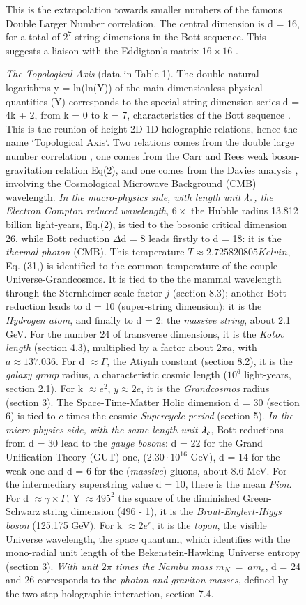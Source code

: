 \documentclass[twoside,draft]{article}
\begin{document}
\begin{sloppypar}
\begin{figure}
\caption{\textit{The Topological Axis} (data in Table 1). The double natural logarithms y = ln(ln(Y)) of the main dimensionless physical quantities (Y) corresponds to the special string dimension series d = 4k + 2, from k = 0 to k = 7, characteristics of the Bott sequence \cite{Cartan}. This is the reunion of height 2D-1D holographic relations, hence the name `Topological Axis`. Two relations comes from the double large number correlation \cite{Eddington}, one comes from the Carr and Rees weak boson-gravitation relation Eq(2), and one comes from the Davies analysis \cite{Davies}, involving the Cosmological Microwave Background (CMB) wavelength. \textit{In the macro-physics side, with length unit $\lambdabar_e$, the Electron Compton reduced wavelength}, $6 \times$ the Hubble radius 13.812 billion light-years, Eq.(2), is tied to the bosonic critical dimension 26, while Bott reduction $\Delta$d = 8 leads firstly to  d = 18: it is the \textit{thermal photon} (CMB). This temperature $T \approx 2.725820805 Kelvin$, Eq. (31,) is identified to the common temperature of the couple Universe-Grandcosmos. It is tied to the the mammal wavelength through the Sternheimer scale factor $j$ (section 8.3); another Bott reduction leads to d = 10 (super-string dimension): it is the \textit{Hydrogen atom}, and finally to d = 2: the \textit{massive string}, about 2.1 GeV. For the number 24 of transverse dimensions, it is the \textit{Kotov length} (section 4.3), multiplied by a factor about 2$\pi a$, with $a \approx 137.036$. For d $\approx \Gamma$, the Atiyah constant (section 8.2), it is the \textit{galaxy group} radius, a characteristic cosmic length ($10^{6}$ light-years, section 2.1). For k $\approx e^{2}$, $y \approx 2e$, it is the \textit{Grandcosmos} radius (section 3). 
The Space-Time-Matter Holic dimension d = 30 (section 6) is tied to $c$ times the cosmic \textit{Supercycle period} (section 5). 
\textit{In the micro-physics side, with the same length unit $\lambdabar_e$}, Bott reductions from d = 30 lead to the \textit{gauge bosons}: d = 22 for the Grand Unification Theory (GUT) one, ($ 2.30\cdot10^{16}$ GeV), d = 14 for the weak one and d = 6 for the (\textit{massive}) gluons, about 8.6 MeV.
For the intermediary superstring value d = 10, there is the mean \textit{Pion}. For d $\approx \gamma \times \Gamma$, Y $\approx 495^2$ the square of the diminished Green-Schwarz string dimension (496 - 1), it is the \textit{Brout-Englert-Higgs boson} (125.175 GeV). For k $\approx 2e^e$, it is the \textit{topon}, the visible Universe wavelength, the space quantum, which identifies with the mono-radial unit length of the Bekenstein-Hawking Universe entropy (section 3).
   \textit{With unit $2\pi$ times the Nambu mass $m_N~=~am_e$}\cite{Nambu}, d = 24 and 26 corresponds to the \textit{photon and graviton masses}, defined by the two-step holographic interaction\cite{Sanchez1}, section 7.4.}
This is the extrapolation towards smaller numbers of the famous Double Larger Number correlation.
The central dimension is d = 16, for a total of $2^7$ string dimensions in the Bott sequence.
This suggests a liaison with the Eddigton's matrix $16 \times 16$ \cite{Eddington}. 
    

\end{figure}
\end{sloppypar}
\end{document}

